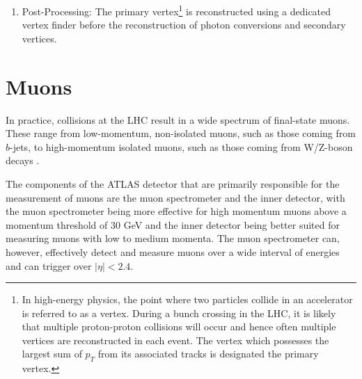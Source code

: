 \begin{enumerate}
\item Post-Processing: The primary vertex\footnote{In high-energy physics, the point where two particles collide in an accelerator is referred to as a vertex. During a bunch crossing in the LHC, it is likely that multiple proton-proton collisions will occur and hence often multiple vertices are reconstructed in each event. The vertex which possesses the largest sum of $p_{T}$ from its associated tracks is designated the primary vertex.} is reconstructed using a dedicated vertex finder before the reconstruction of photon conversions and secondary vertices.
\end{enumerate}
\section{Muons}
\label{muon_reco}
In practice, collisions at the LHC result in a wide spectrum of final-state muons. These range from low-momentum, non-isolated muons, such as those coming from $b$-jets, to high-momentum isolated muons, such as those coming from W/Z-boson decays \cite{ATLAS}.

The components of the ATLAS detector that are primarily responsible for the measurement of muons are the muon spectrometer and the inner detector, with the muon spectrometer being more effective for high momentum muons above a momentum threshold of 30 GeV and the inner detector being better suited for measuring muons with low to medium momenta. The muon spectrometer can, however, effectively detect and measure muons over a wide interval of energies and can trigger over $| \eta | < 2.4$.

